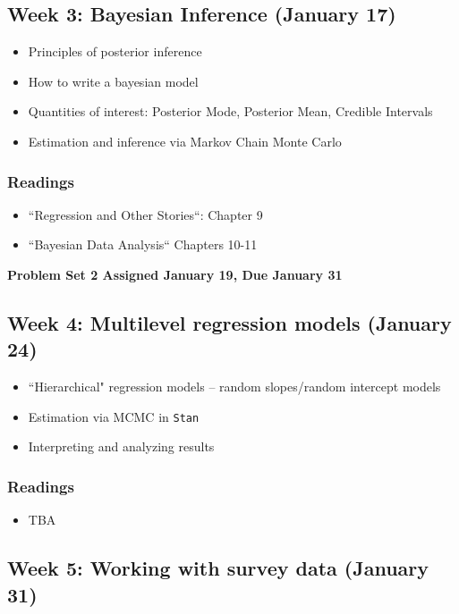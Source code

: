 \documentclass[11pt, article, oneside]{memoir}
\theoremstyle{Assumption}
\begin{document}
\subsection{Week 3: Bayesian Inference (January 17)}

\begin{itemize}
\item Principles of posterior inference
\item How to write a bayesian model
\item Quantities of interest: Posterior Mode, Posterior Mean, Credible Intervals
\item Estimation and inference via Markov Chain Monte Carlo
\end{itemize}

\subsubsection*{Readings}

\begin{itemize}
\item ``Regression and Other Stories``: Chapter 9
\item ``Bayesian Data Analysis`` Chapters 10-11
\end{itemize}


\textbf{Problem Set 2 Assigned January 19, Due January 31}

\subsection{Week 4: Multilevel regression models (January 24)}

\begin{itemize}
\item ``Hierarchical" regression models -- random slopes/random intercept models
\item Estimation via MCMC in \texttt{Stan}
\item Interpreting and analyzing results
\end{itemize}

\subsubsection*{Readings}

\begin{itemize}
\item TBA
\end{itemize}


\subsection{Week 5: Working with survey data (January 31)}
\end{document}
